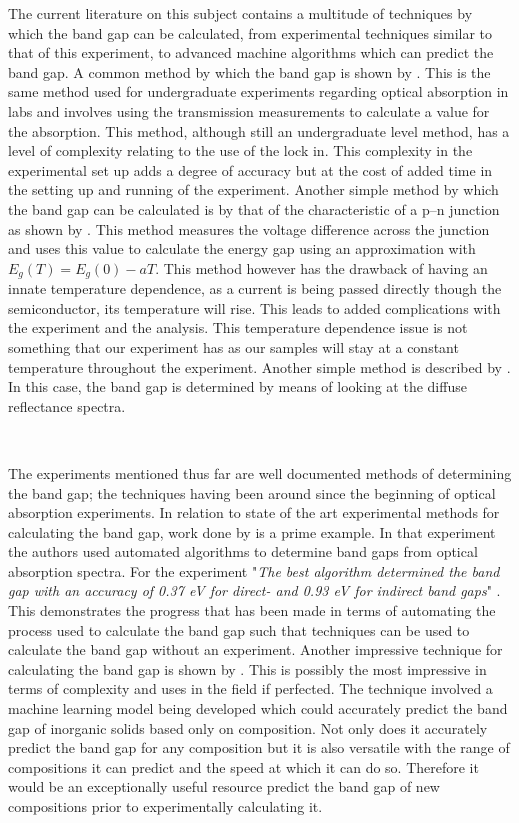 \documentclass{article}
\begin{document}
The current literature on this subject contains a multitude of techniques by which the band gap can be calculated, from experimental techniques similar to that of this experiment, to advanced machine algorithms which can predict the band gap. A common method by which the band gap is shown by \citeauthor{martil1992undergraduate} \cite{martil1992undergraduate}. This is the same method used for undergraduate experiments regarding optical absorption in labs and involves using the transmission measurements to calculate a value for the absorption. This method, although still an undergraduate level method, has a level of complexity relating to the use of the lock in. This complexity in the experimental set up adds a degree of accuracy but at the cost of added time in the setting up and running of the experiment. Another simple method by which the band gap can be calculated is by that of the characteristic of a p--n junction as shown by \citeauthor{Kirkup1986UndergraduateED} \cite{Kirkup1986UndergraduateED}. This method measures the voltage difference across the junction and uses this value to calculate the energy gap using an approximation with $E_g(T) = E_g(0) - aT$. This method however has the drawback of having an innate temperature dependence, as a current is being passed directly though the semiconductor, its temperature will rise. This leads to added complications with the experiment and the analysis. This temperature dependence issue is not something that our experiment has as our samples  will stay at a constant temperature throughout the experiment. Another simple method is described by \citeauthor{shimadzu} \cite{shimadzu}. In this case, the band gap is determined by means of looking at the diffuse reflectance spectra. 

\

The experiments mentioned thus far are well documented methods of determining the band gap; the techniques having been around since the beginning of optical absorption experiments. In relation to state of the art experimental methods for calculating the band gap, work done by \citeauthor{SCHWARTING201743} \cite{SCHWARTING201743} is a prime example. In that experiment the authors used automated algorithms to determine band gaps from optical absorption spectra. For the experiment  "\textit{The best algorithm determined the band gap with an accuracy of 0.37 eV for direct- and 0.93 eV for indirect band gaps}"  \cite{SCHWARTING201743}. This demonstrates the progress that has been made in terms of automating the process used to calculate the band gap such that techniques can be used to calculate the band gap without an experiment. Another impressive technique for calculating the band gap is shown by \citeauthor{predict} \cite{predict}. This is possibly the most impressive in terms of complexity and uses in the field if perfected. The technique involved a machine learning model being developed which could accurately predict the band gap of inorganic solids based only on composition. Not only does it accurately predict the band gap for any composition but it is also versatile with the range of compositions it can predict and the speed at which it can do so. Therefore it would be an exceptionally useful resource predict the band gap of new compositions prior to experimentally calculating it. 
\end{document}
